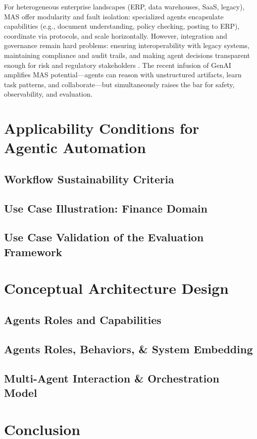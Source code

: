 For heterogeneous enterprise landscapes (ERP, data warehouses, SaaS, legacy), MAS offer modularity and fault isolation: specialized agents encapsulate capabilities (e.g., document understanding, policy checking, posting to ERP), coordinate via protocols, and scale horizontally. However, integration and governance remain hard problems: ensuring interoperability with legacy systems, maintaining compliance and audit trails, and making agent decisions transparent enough for risk and regulatory stakeholders \parencite{Luck2005}. The recent infusion of GenAI amplifies MAS potential—agents can reason with unstructured artifacts, learn task patterns, and collaborate—but simultaneously raises the bar for safety, observability, and evaluation.

\section{Applicability Conditions for Agentic Automation} 
\subsection{Workflow Sustainability Criteria}
\subsection{Use Case Illustration: Finance Domain}
\subsection{Use Case Validation of the Evaluation Framework}
\newpage  
\section{Conceptual Architecture Design} \label{sec:5architectDesign}
\subsection{Agents Roles and Capabilities}
\subsection{Agents Roles, Behaviors, \& System Embedding}
\subsection{Multi-Agent Interaction \& Orchestration Model}
\label{sec:conceptualarchitecture}
\newpage 
\section{Conclusion}